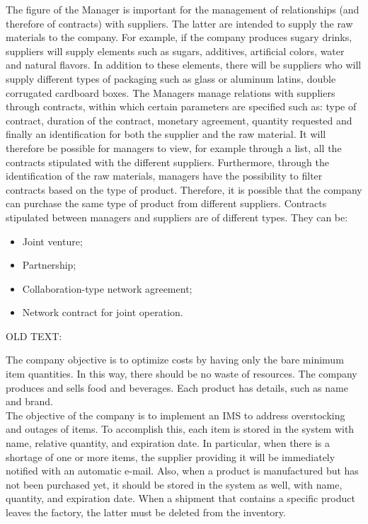 The figure of the Manager is important for the management of relationships (and therefore of contracts) with suppliers.
The latter are intended to supply the raw materials to the company. For example, if the company produces sugary drinks, suppliers
will supply elements such as sugars, additives, artificial colors, water and natural flavors. In addition to these elements, there
will be suppliers who will supply different types of packaging such as glass or aluminum latins, double corrugated cardboard boxes.
The Managers manage relations with suppliers through contracts, within which certain parameters are specified such as: type of
contract, duration of the contract, monetary agreement, quantity requested and finally an identification for both the supplier
and the raw material. It will therefore be possible for managers to view, for example through a list, all the contracts stipulated
with the different suppliers. Furthermore, through the identification of the raw materials, managers have the possibility to filter
contracts based on the type of product. Therefore, it is possible that the company can purchase the same type of product from different suppliers.
Contracts stipulated between managers and suppliers are of different types. They can be:
\begin{itemize}
    \item Joint venture;
    \item Partnership;
    \item Collaboration-type network agreement;
    \item Network contract for joint operation.
\end{itemize}



OLD TEXT:

The company objective is to optimize costs by having only the bare minimum item quantities. In this way, there should be no waste of resources. The company produces and sells food and beverages. Each product has details, such as name and brand.\\

The objective of the company is to implement an IMS to address overstocking and outages of items. To accomplish this, each item is stored in the system with name, relative quantity, and expiration date. In particular, when there is a shortage of one or more items, the supplier providing it will be immediately notified with an automatic e-mail. Also, when a product is manufactured but has not been purchased yet, it should be stored in the system as well, with name, quantity, and expiration date. When a shipment that contains a specific product leaves the factory, the latter must be deleted from the inventory.\\

